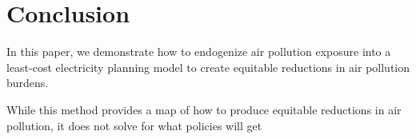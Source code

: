 \documentclass[a4paper]{article}
\theoremstyle{definition}
\theoremstyle{plain}
\begin{document}
\section{Conclusion}
In this paper, we demonstrate how to endogenize air pollution exposure into a least-cost electricity planning model to create equitable reductions in air pollution burdens.    

While this method provides a map of how to produce equitable reductions in air pollution, it does not solve for what policies will get


\begin{singlespace}
\newpage

%

\end{singlespace}
\end{document}
